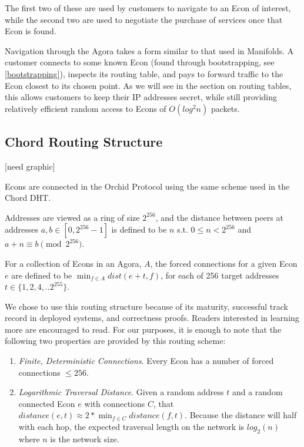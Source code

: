 \documentclass{article}
\newcommand{\orchid}{Orchid}
\newcommand{\Orchid}{\orchid}
\begin{document}
The first two of these are used by customers to navigate to an Econ of
interest, while the second two are used to negotiate the purchase of
services once that Econ is found.

Navigation through the Agora takes a form similar to that used in
Manifolds. A customer connects to some known Econ (found through
bootstrapping, see \ref{bootstrapping}), inspects its routing table,
and pays to forward traffic to the Econ closest to its chosen
point. As we will see in the section on routing tables, this allows
customers to keep their IP addresses secret, while still providing
relatively efficient random access to Econs of $O(log^2 n)$ packets.

\subsection{Chord Routing Structure}

[need graphic]

Econs are connected in the \Orchid{} Protocol using the same scheme used
in the Chord DHT.

Addresses are viewed as a ring of size $2^{256}$, and the distance
between peers at addresses $a, b \in [0, 2^{256}-1]$ is defined to be
$n$ s.t. $0 \leq n < 2^{256}$ and $a + n \equiv b \pmod{2^{256}}$.

For a collection of Econs in an Agora, $A$, the forced connections for
a given Econ $e$ are defined to be $\min_{f \in A} dist(e+t, f)$, for
each of 256 target addresses $t \in \{1, 2, 4, .. 2^{255}\}$.

We chose to use this routing structure because of its maturity,
successful track record in deployed systems, and correctness
proofs. Readers interested in learning more are encouraged to
read\cite{CHORD}. For our purposes, it is enough to note that the
following two properties are provided by this routing scheme:

\begin{enumerate}
\item \emph{Finite, Deterministic Connections}. Every Econ has a
  number of forced connections $\leq 256$.
\item \emph{Logarithmic Traversal Distance}. Given a random address
  $t$ and a random connected Econ $e$ with connections $C$, that
  $distance(e, t) \approx 2 * \min_{f \in C} distance(f, t)$. Because
  the distance will half with each hop, the expected traversal length
  on the network is $log_2(n)$ where $n$ is the network size.
\end{enumerate}
\end{document}
